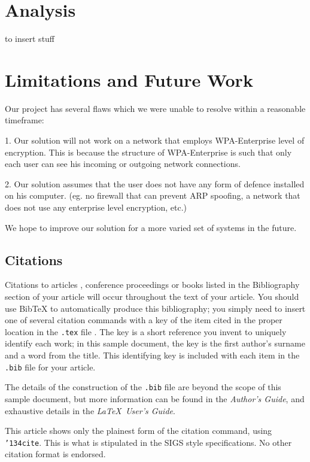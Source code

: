 \documentclass{acm_proc_article-sp}
\begin{document}
\section{Analysis}
to insert stuff 

\section{Limitations and Future Work}
Our project has several flaws which we were unable to resolve within a reasonable timeframe: 

1. Our solution will not work on a network that employs WPA-Enterprise level of encryption. This is because the structure of WPA-Enterprise is such that only each user can see his incoming or outgoing network connections. 

2. Our solution assumes that the user does not have any form of defence installed on his computer. (eg. no firewall that can prevent ARP spoofing, a network that does not use any enterprise level encryption, etc.) 

We hope to improve our solution for a more varied set of systems in the future. 

\subsection{Citations}
Citations to articles \cite{bowman:reasoning, clark:pct, braams:babel, herlihy:methodology},
conference
proceedings \cite{clark:pct} or books \cite{salas:calculus, Lamport:LaTeX} listed
in the Bibliography section of your
article will occur throughout the text of your article.
You should use BibTeX to automatically produce this bibliography;
you simply need to insert one of several citation commands with
a key of the item cited in the proper location in
the \texttt{.tex} file \cite{Lamport:LaTeX}.
The key is a short reference you invent to uniquely
identify each work; in this sample document, the key is
the first author's surname and a
word from the title.  This identifying key is included
with each item in the \texttt{.bib} file for your article.

The details of the construction of the \texttt{.bib} file
are beyond the scope of this sample document, but more
information can be found in the \textit{Author's Guide},
and exhaustive details in the \textit{\LaTeX\ User's
Guide}\cite{Lamport:LaTeX}.

This article shows only the plainest form
of the citation command, using \texttt{{\char'134}cite}.
This is what is stipulated in the SIGS style specifications.
No other citation format is endorsed.
\end{document}
